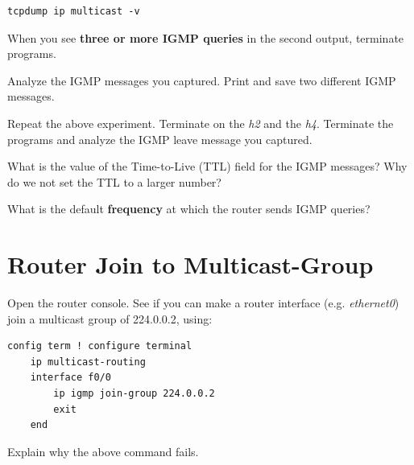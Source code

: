 \documentclass{../UTNetLab}
\begin{document}
\begin{lstlisting}[emph={eth0},morekeywords={[3]multicast}]
tcpdump ip multicast -v
\end{lstlisting}
When you see \textbf{three or more IGMP queries} in the second  output, terminate  programs.

Analyze the IGMP messages you captured.
Print and save two different IGMP messages.

Repeat the above experiment.
Terminate  on the \textit{h2} and the \textit{h4}.
Terminate the  programs and analyze the IGMP leave message you captured.

\begin{report}
    \item What is the value of the Time-to-Live (TTL) field for the IGMP messages?
    Why do we not set the TTL to a larger number?

    \item What is the default \textbf{frequency} at which the router sends IGMP queries?
\end{report}

\section{Router Join to Multicast-Group}
Open the router console.
See if you can make a router interface (e.g. \textit{ethernet0}) join a multicast group of 224.0.0.2, using:

\begin{lstlisting}[language={cisco}]
config term ! configure terminal
    ip multicast-routing
    interface f0/0
        ip igmp join-group 224.0.0.2
        exit
    end
\end{lstlisting}

\begin{report}
    \item Explain why the above command fails.
\end{report}
\end{document}
